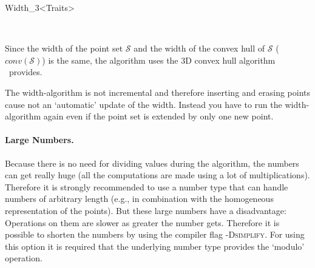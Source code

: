 \begin{ccRefClass}{Width_3<Traits>}
\begin{ccIndexMemberFunctions}



\end{ccIndexMemberFunctions}

\ccSeeAlso

\\[1ex]

\ccImplementation
\ccIndexImplementation

Since the width of the point set $\mathcal{S}$ and the width of the convex
hull of $\mathcal{S}$ ($\mathit{conv(\mathcal{S})}$) is the same, the
algorithm uses the 3D convex hull algorithm \cgal\ provides.

The width-algorithm is not incremental and therefore inserting and
erasing points cause not an `automatic' update of the width. Instead
you have to run the width-algorithm again even if the point set is
extended by only one new point.

\begin{ccAdvanced}

\paragraph{Large Numbers.}

Because there is no need for dividing values during the algorithm, the
numbers can get really huge (all the computations are made using a lot
of multiplications).  Therefore it is strongly recommended to use a
number type that can handle numbers of arbitrary length (e.g.,
 in combination with the homogeneous representation
of the points). But these large numbers have a disadvantage:
Operations on them are slower as greater the number gets. Therefore it
is possible to shorten the numbers by using the compiler flag
\textsc{-Dsimplify}. For using this option it is required that
the underlying number type provides the `modulo' operation. 


\end{ccAdvanced}
\end{ccRefClass}
